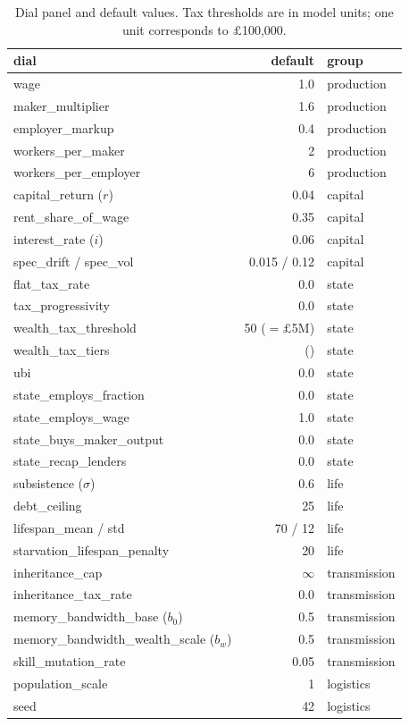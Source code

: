\documentclass[11pt]{article}
\begin{document}
\begin{table}[h]
\centering
\small
\caption{Dial panel and default values. Tax thresholds are in model
units; one unit corresponds to $\pounds$100{,}000.}
\label{tab:dials}
\begin{tabular}{lrl}
\toprule
dial & default & group \\
\midrule
wage                          & 1.0 & production \\
maker\_multiplier             & 1.6 & production \\
employer\_markup              & 0.4 & production \\
workers\_per\_maker           & 2   & production \\
workers\_per\_employer        & 6   & production \\
capital\_return ($r$)         & 0.04 & capital \\
rent\_share\_of\_wage         & 0.35 & capital \\
interest\_rate ($i$)          & 0.06 & capital \\
spec\_drift / spec\_vol       & 0.015 / 0.12 & capital \\
flat\_tax\_rate               & 0.0 & state \\
tax\_progressivity            & 0.0 & state \\
wealth\_tax\_threshold        & 50 ($=\pounds$5M) & state \\
wealth\_tax\_tiers            & ()  & state \\
ubi                           & 0.0 & state \\
state\_employs\_fraction      & 0.0 & state \\
state\_employs\_wage          & 1.0 & state \\
state\_buys\_maker\_output    & 0.0 & state \\
state\_recap\_lenders         & 0.0 & state \\
subsistence ($\sigma$)        & 0.6 & life \\
debt\_ceiling                 & 25  & life \\
lifespan\_mean / std          & 70 / 12 & life \\
starvation\_lifespan\_penalty & 20  & life \\
inheritance\_cap              & $\infty$ & transmission \\
inheritance\_tax\_rate        & 0.0 & transmission \\
memory\_bandwidth\_base ($b_0$) & 0.5 & transmission \\
memory\_bandwidth\_wealth\_scale ($b_w$) & 0.5 & transmission \\
skill\_mutation\_rate         & 0.05 & transmission \\
population\_scale             & 1 & logistics \\
seed                          & 42 & logistics \\
\bottomrule
\end{tabular}
\end{table}
\end{document}
